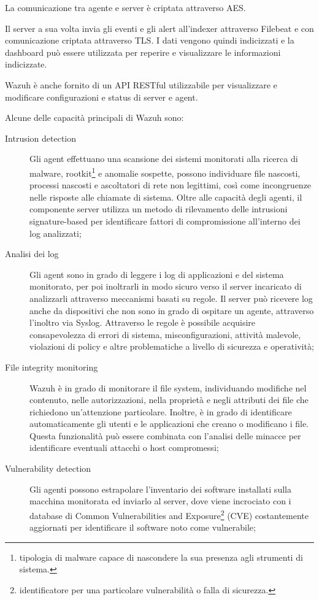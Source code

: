 La comunicazione tra agente e server è criptata attraverso AES.

Il server a sua volta invia gli eventi e gli alert all'indexer attraverso Filebeat e con comunicazione criptata attraverso TLS.
I dati vengono quindi indicizzati e la dashboard può essere utilizzata per reperire e visualizzare le informazioni indicizzate.

Wazuh è anche fornito di un API RESTful utilizzabile per visualizzare e modificare configurazioni e status di server e agent.

Alcune delle capacità principali di Wazuh sono:
\begin{description}
    \item [Intrusion detection]  Gli agent effettuano una scansione dei sistemi monitorati alla ricerca di malware, rootkit\footnote{tipologia di malware capace di nascondere la sua presenza agli strumenti di sistema.} e anomalie sospette, possono  individuare file nascosti, processi nascosti e ascoltatori di rete non legittimi, così come incongruenze nelle risposte alle chiamate di sistema. Oltre alle capacità degli agenti, il componente server utilizza un metodo di rilevamento delle intrusioni signature-based per identificare fattori di compromissione all'interno dei log analizzati;
    \item [Analisi dei log] Gli agent sono in grado di leggere i log di applicazioni e del sistema monitorato, per poi inoltrarli in modo sicuro verso il server incaricato di analizzarli attraverso meccanismi basati su regole. Il server può ricevere log anche da dispositivi che non sono in grado di ospitare un agente, attraverso l'inoltro via Syslog. Attraverso le regole è possibile acquisire consapevolezza di errori di sistema, misconfigurazioni, attività malevole, violazioni di policy e altre problematiche a livello di sicurezza e operatività;
    \item [File integrity monitoring] Wazuh è in grado di monitorare il file system, individuando modifiche nel contenuto, nelle autorizzazioni, nella proprietà e negli attributi dei file che richiedono un'attenzione particolare. Inoltre, è in grado di identificare automaticamente gli utenti e le applicazioni che creano o modificano i file. Questa funzionalità può essere combinata con l'analisi delle minacce per identificare eventuali attacchi o host compromessi;
    \item [Vulnerability detection] Gli agenti possono estrapolare l'inventario dei software installati sulla macchina monitorata ed inviarlo  al server, dove viene incrociato con i database di  Common Vulnerabilities and Exposure\footnote{identificatore per una particolare vulnerabilità o falla di sicurezza.} (CVE) costantemente aggiornati per identificare il software noto come vulnerabile;

\end{description}
